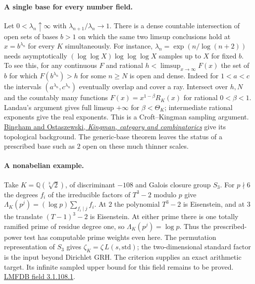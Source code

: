 \paragraph{A single base for every number field.}
Let $0<\lambda_n\uparrow\infty$ with $\lambda_{n+1}/\lambda_n\to1$.
There is a dense countable intersection of open sets of bases $b>1$
on which the same two limsup conclusions hold at $x=b^{\lambda_n}$
for every $K$ simultaneously. For instance,
$\lambda_n=\exp(n/\log(n+2))$ needs asymptotically
$(\log\log X)\log\log\log X$ samples up to $X$ for fixed $b$.
To see this, for any continuous $F$ and rational $h<\limsup_{x\to\infty}F(x)$
the set of $b$ for which $F(b^{\lambda_n})>h$ for some $n\ge N$ is open
and dense. Indeed for $1<a<c$ the intervals
$(a^{\lambda_n},c^{\lambda_n})$ eventually overlap and cover a ray.
Intersect over $h,N$ and the countably many functions
$F(x)=x^{1-\beta}R_K(x)$ for rational $0<\beta<1$. Landau's argument gives
full limsup $+\infty$ for $\beta<\Theta_K$; intermediate rational exponents
give the real exponents. This is a Croft--Kingman sampling argument.
\href{https://doi.org/10.1017/CBO9781139107174.008}{Bingham and Ostaszewski,
\emph{Kingman, category and combinatorics}} give its topological background.
The generic-base theorem leaves the status of a prescribed base such as $2$
open on these much thinner scales.

\paragraph{A nonabelian example.}
Take $K=\mathbb Q(\sqrt[3]{2})$, of discriminant $-108$ and Galois closure
group $S_3$. For $p\nmid6$ the degrees $f_i$ of the irreducible factors of
$T^3-2$ modulo $p$ give $\Lambda_K(p^j)=(\log p)\sum_{f_i\mid j}f_i$.
At $2$ the polynomial $T^3-2$ is Eisenstein, and at $3$ the translate $(T-1)^3-2$ is Eisenstein. At either prime there is one totally ramified prime of residue degree one, so
$\Lambda_K(p^j)=\log p$. Thus the prescribed-power test has computable
prime weights even here. The permutation representation of $S_3$ gives
$\zeta_K=\zeta\,L(s,\mathrm{std})$; the two-dimensional standard factor
is the input beyond Dirichlet GRH. The criterion supplies an exact
arithmetic target. Its infinite sampled upper bound for this field
remains to be proved.\quad
\href{https://www.lmfdb.org/NumberField/3.1.108.1}{LMFDB field 3.1.108.1}.

